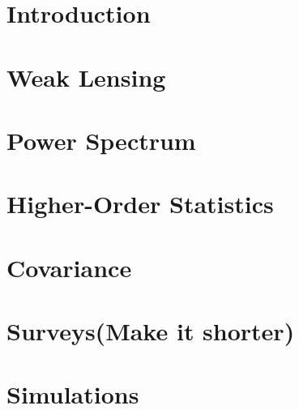 \documentclass[11pt,a4paper]{ipmu}
\begin{document}
\makethesistitle

%     

\tableofcontents  %
\listoffigures    %
\listoftables     %

\chapter{Introduction}


%

%

\chapter{Weak Lensing}


\chapter{Power Spectrum}


\chapter{Higher-Order Statistics}





\chapter{Covariance}


\chapter{Surveys(Make it shorter)}






\chapter{Simulations}

\end{document}
